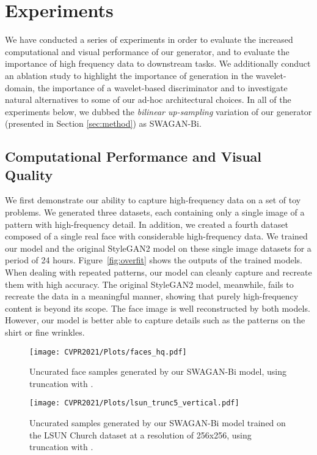 \documentclass[final]{CVPR2021/cvpr}
\begin{document}
\section{Experiments}
\label{sec:exp}

We have conducted a series of experiments in order to evaluate the increased computational and visual performance of our generator, and to evaluate the importance of high frequency data to downstream tasks.
We additionally conduct an ablation study to highlight the importance of generation in the wavelet-domain, the importance of a wavelet-based discriminator and to investigate natural alternatives to some of our ad-hoc architectural choices.
In all of the experiments below, we dubbed the \textit{bilinear up-sampling} variation of our generator (presented in Section \ref{sec:method}) as SWAGAN-Bi.

\subsection{Computational Performance and Visual \mbox{Quality}}

We first demonstrate our ability to capture high-frequency data on a set of toy problems. We generated three datasets, each containing only a single image of a pattern with high-frequency detail. In addition, we created a fourth dataset composed of a single real face with considerable high-frequency data. We trained our model and the original StyleGAN2 model on these single image datasets for a period of 24 hours. Figure~\ref{fig:overfit} shows the outputs of the trained models. When dealing with repeated patterns, our model can cleanly capture and recreate them with high accuracy. The original StyleGAN2 model, meanwhile, fails to recreate the data in a meaningful manner, showing that purely high-frequency content is beyond its scope. The face image is well reconstructed by both models. However, our model is better able to capture details such as the patterns on the shirt or fine wrinkles.

\begin{figure*}[!hbt]
\begin{center}
\texttt{[image: CVPR2021/Plots/faces\_hq.pdf]}
\end{center}
   \caption{Uncurated face samples generated by our SWAGAN-Bi model, using truncation with .}
\label{fig:fig_gen_1024}
\end{figure*}

\begin{figure}[!hbt]
\begin{center}
\texttt{[image: CVPR2021/Plots/lsun\_trunc5\_vertical.pdf]}
\end{center}
   \caption{Uncurated samples generated by our SWAGAN-Bi model trained on the LSUN Church dataset at a resolution of 256x256, using truncation with .}
\label{fig:fig_gen_256}
\end{figure}
\end{document}
